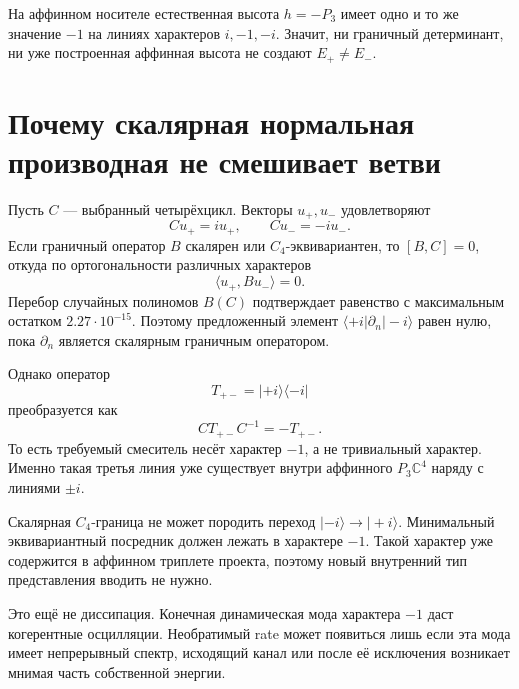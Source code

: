 На аффинном носителе естественная высота $h=-P_3$ имеет одно и то же
значение $-1$ на линиях характеров $i,-1,-i$. Значит, ни граничный
детерминант, ни уже построенная аффинная высота не создают
$E_+\ne E_-$.

\section{Почему скалярная нормальная производная не смешивает ветви}

Пусть $C$ --- выбранный четырёхцикл. Векторы $u_+,u_-$ удовлетворяют
\begin{equation}
 Cu_+=iu_+,
 \qquad
 Cu_-=-iu_-.
\end{equation}
Если граничный оператор $B$ скалярен или $C_4$-эквивариантен, то
$[B,C]=0$, откуда по ортогональности различных характеров
\begin{equation}
 \langle u_+,Bu_-\rangle=0.
 \label{eq:v6-compacton-equivariant-boundary-zero}
\end{equation}
Перебор случайных полиномов $B(C)$ подтверждает равенство с максимальным
остатком $2.27\cdot10^{-15}$. Поэтому предложенный элемент
$\langle+i|\partial_n|-i\rangle$ равен нулю, пока $\partial_n$ является
скалярным граничным оператором.

Однако оператор
\begin{equation}
 T_{+-}=|+i\rangle\langle-i|
\end{equation}
преобразуется как
\begin{equation}
 CT_{+-}C^{-1}=-T_{+-}.
 \label{eq:v6-compacton-minus-character-mixer}
\end{equation}
То есть требуемый смеситель несёт характер $-1$, а не тривиальный
характер. Именно такая третья линия уже существует внутри аффинного
$P_3\mathbb C^4$ наряду с линиями $\pm i$.

\begin{theorem}
Скалярная $C_4$-граница не может породить переход
$|-i\rangle\to|+i\rangle$. Минимальный эквивариантный посредник должен
лежать в характере $-1$. Такой характер уже содержится в аффинном
триплете проекта, поэтому новый внутренний тип представления вводить не
нужно.
\end{theorem}

Это ещё не диссипация. Конечная динамическая мода характера $-1$ даст
когерентные осцилляции. Необратимый rate может появиться лишь если эта
мода имеет непрерывный спектр, исходящий канал или после её исключения
возникает мнимая часть собственной энергии.

